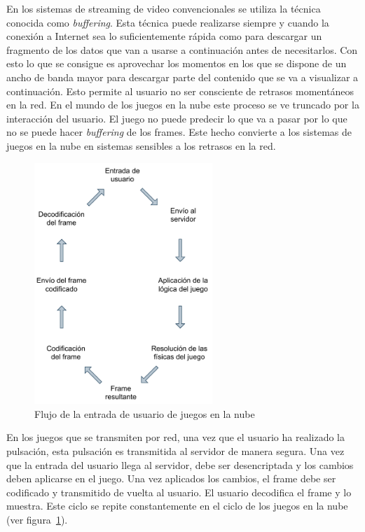 En los sistemas de streaming de video convencionales se utiliza la t\'ecnica conocida como \textit{buffering}. Esta t\'ecnica puede realizarse siempre y cuando la conexi\'on a Internet sea lo suficientemente r\'apida como para descargar un fragmento de los datos que van a usarse a continuaci\'on antes de necesitarlos. Con esto lo que se consigue es aprovechar los momentos en los que se dispone de un ancho de banda mayor para descargar parte del contenido que se va a visualizar a continuaci\'on. Esto permite al usuario no ser consciente de retrasos moment\'aneos en la red. En el mundo de los juegos en la nube este proceso se ve truncado por la interacci\'on del usuario. El juego no puede predecir lo que va a pasar por lo que no se puede hacer \textit{buffering} de los frames. Este hecho convierte a los sistemas de juegos en la nube en sistemas sensibles a los retrasos en la red.\\

\begin{figure}[h]

\centering
\includegraphics[width=0.6\textwidth]{./Imagenes/Vectorial/cloudgaming cycle.pdf}
\caption{Flujo de la entrada de usuario de juegos en la nube}
\label{cycle}
\end{figure}

En los juegos que se transmiten por red, una vez que el usuario ha realizado la pulsaci\'on, esta pulsaci\'on es transmitida al servidor de manera segura. Una vez que la entrada del usuario llega al servidor, debe ser desencriptada y los cambios deben aplicarse en el juego. Una vez aplicados los cambios, el frame debe ser codificado y transmitido de vuelta al usuario. El usuario decodifica el frame y lo muestra. Este ciclo se repite constantemente en el ciclo de los juegos en la nube (ver figura~\ref{cycle}).\\

